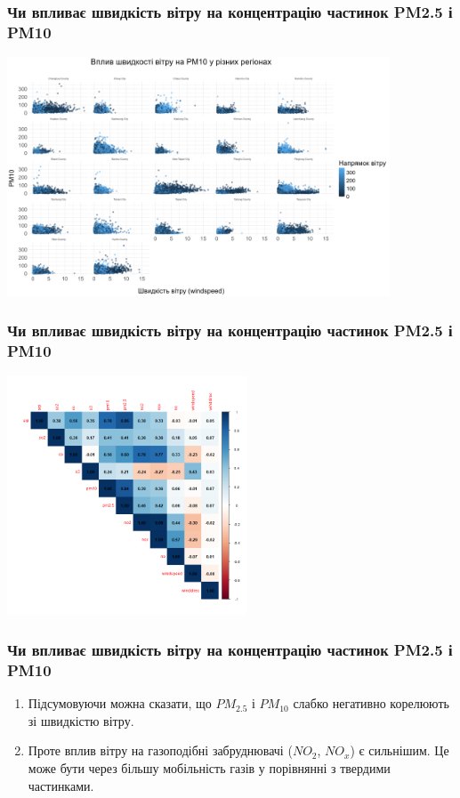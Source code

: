 \documentclass{beamer}
\begin{document}
\begin{frame}
  \frametitle{Чи впливає швидкість вітру на концентрацію частинок PM2.5 і PM10}

  \begin{center}
    \includegraphics[height=2.8in]{plots/question1/scatter_pm10_region.png}
  \end{center}
\end{frame}

\begin{frame}
  \frametitle{Чи впливає швидкість вітру на концентрацію частинок PM2.5 і PM10}

  \begin{center}
    \includegraphics[height=2.8in]{plots/question1/corr_matrix_plot.png}
  \end{center}
\end{frame}

\begin{frame}
  \frametitle{Чи впливає швидкість вітру на концентрацію частинок PM2.5 і PM10}

  \begin{enumerate}
    \item Підсумовуючи можна сказати, що $PM_{2.5}$ і $ PM_{10}$ слабко негативно корелюють зі швидкістю вітру.
    \item Проте вплив вітру на газоподібні забруднювачі ($NO_2$, $NO_x$) є сильнішим. 
    Це може бути через більшу мобільність газів у порівнянні з твердими частинками.
  \end{enumerate}

\end{frame}
\end{document}
